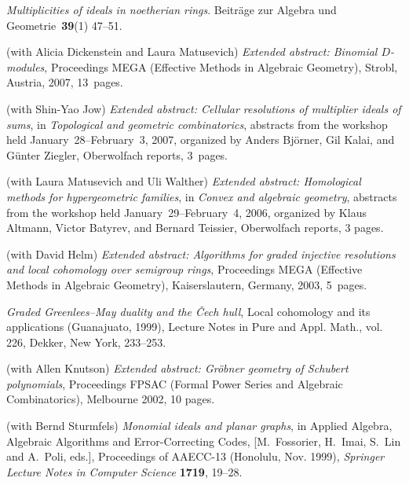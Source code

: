 \documentclass[11pt]{proposal}
\def\bibsubsec#1{\item[\textsf{\hspace{-2.2ex}\textbf{#1}}]\vspace{.5ex}\item[]\vspace{-2.5ex}}
\def\bibyear#1{\makebox[-1ex][l]{}\marginpar[{\flushright{\small#1}}]{}}
\begin{document}
\begin{thebibliography}{33}
\bibyear{1998}
\emph{Multiplicities of ideals in noetherian rings}.  Beitr\"age zur
	Algebra und Geometrie~\textbf{39}(1) 47--51.

\bibsubsec{\sf Conference publications (peer-reviewed and/or invited)}

\bibyear{2007}
(with Alicia Dickenstein and Laura Matusevich) \emph{Extended
	abstract: Binomial $D$-modules}, Proceedings MEGA (Effective
	Methods in Algebraic Geometry), Strobl, Austria, 2007,
	13~pages.

(with Shin-Yao Jow) \emph{Extended abstract: Cellular resolutions of
	multiplier ideals of sums}, in \emph{Top\-ological and geometric
	combinatorics}, abstracts from the workshop held
	January~28--February~3, 2007, organized by Anders Bj\"orner,
	Gil Kalai, and G\"unter Ziegler, Oberwolfach reports, 3~pages.

\bibyear{2006}
(with Laura Matusevich and Uli Walther) \emph{Extended abstract:
	Homological methods for hypergeometric families}, in
	\emph{Convex and algebraic geometry}, abstracts from the
	workshop held January~29--February~4, 2006, organized by
	Klaus Altmann, Victor Batyrev, and Bernard Teissier,
	Oberwolfach reports, 3 pages.

\bibyear{2003}
(with David Helm) \emph{Extended abstract: Algorithms for graded
	injective resolutions and local cohomology over semigroup
	rings}, Proceedings MEGA (Effective Methods in Algebraic
	Geometry), Kaiserslautern, Germany, 2003, 5~pages.

\bibyear{2002}
\emph{Graded Greenlees--May duality and the \v Cech hull}, Local
	cohomology and its applications (Guanajuato, 1999), Lecture
	Notes in Pure and Appl. Math., vol. 226, Dekker, New York,
	233--253.

(with Allen Knutson) \emph{Extended abstract: Gr\"obner geometry of
	Schubert polynomials}, Proceedings FPSAC (Formal Power Series
	and Algebraic Combinatorics), Melbourne 2002, 10 pages.

\bibyear{1999}
(with Bernd Sturmfels) \emph{Monomial ideals and planar graphs}, in
	Applied Algebra, Algebraic Algorithms and Error-Correcting
	Codes, [M.~Fossorier, H.~Imai, S.~Lin and A.~Poli, eds.],
	Proceedings of AAECC-13 (Honolulu, Nov.  1999), {\sl Springer
	Lecture Notes in Computer Science} \textbf{1719}, 19--28.

\end{thebibliography}
\end{document}
